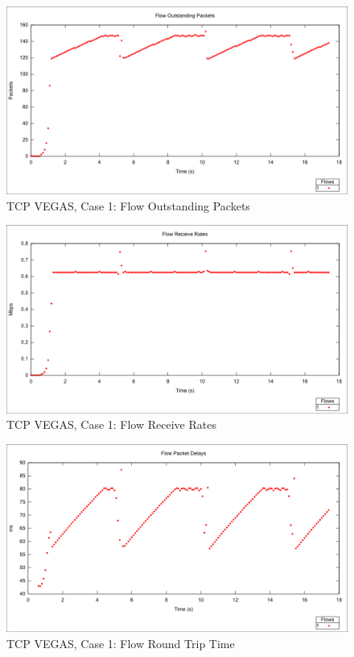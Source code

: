 \newpage
\clearpage



\begin{figure}[htbp]
    \centering
    \includegraphics[width=\textwidth]{vegas1/Flow_Outstanding_Packets.png}
    \caption{TCP VEGAS, Case 1: Flow Outstanding Packets}
\end{figure}

\begin{figure}[htbp]
    \centering
    \includegraphics[width=\textwidth]{vegas1/Flow_Receive_Rates.png}
    \caption{TCP VEGAS, Case 1: Flow Receive Rates }
\end{figure}


\begin{figure}[htbp]
    \centering
    \includegraphics[width=\textwidth]{vegas1/Flow_RTT.png}
    \caption{TCP VEGAS, Case 1: Flow Round Trip Time}
\end{figure}

